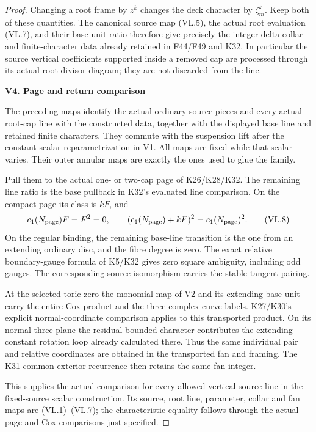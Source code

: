 \begin{proof}
Changing a root frame by \(z^k\) changes the deck
character by \(\zeta_m^k\). Keep both of these
quantities. The canonical source map (VL.5), the
actual root evaluation (VL.7), and their base-unit
ratio therefore give precisely the integer delta
collar and finite-character data already retained
in F44/F49 and K32. In particular the source
vertical coefficients supported inside a removed
cap are processed through its actual root divisor
diagram; they are not discarded from the line.

\par

\medskip\noindent\textbf{V4. Page and return comparison}

\par\nobreak

The preceding maps identify the actual ordinary
source pieces and every actual root-cap line with
the constructed data, together with the displayed
base line and retained finite characters. They
commute with the suspension lift after the constant
scalar reparametrization in V1. All maps are fixed
while that scalar varies. Their outer annular
maps are exactly the ones used to glue the family.

Pull them to the actual one- or two-cap page of
K26/K28/K32. The remaining line ratio is the base
pullback in K32's evaluated line comparison. On
the compact page its class is \(kF\), and
\[
 c_1(N_{\rm page})F=F^2=0,\qquad
 (c_1(N_{\rm page})+kF)^2=c_1(N_{\rm page})^2 .
 \tag{VL.8}
\]
On the regular binding, the remaining base-line
transition is the one from an extending ordinary
disc, and the fibre degree is zero. The exact
relative boundary-gauge formula of K5/K32 gives
zero square ambiguity, including odd gauges.
The corresponding source isomorphism carries
the stable tangent pairing.

At the selected toric zero the monomial map of V2
and its extending base unit carry the entire Cox
product and the three complex curve labels. K27/K30's
explicit normal-coordinate comparison applies to
this transported product. On its normal three-plane
the residual bounded character contributes the
extending constant rotation loop already calculated
there. Thus the same individual pair and relative
coordinates are obtained in the transported fan
and framing. The K31 common-exterior recurrence
then retains the same fan integer.

This supplies the actual comparison for every
allowed vertical source line in the fixed-source
scalar construction. Its source, root line,
parameter, collar and fan maps are (VL.1)--(VL.7);
the characteristic equality follows through the
actual page and Cox comparisons just specified.
\end{proof}
